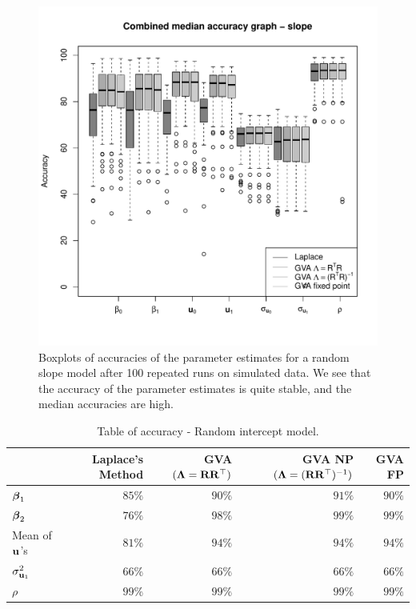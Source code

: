\begin{figure}[h]
	\includegraphics[width=\textwidth]{code/results/median_accuracy_combined_slope.pdf}\bigskip 
	\caption{Boxplots of accuracies of the parameter estimates for a random slope model after 100 repeated
							runs on simulated data. We see that the accuracy of the parameter estimates is quite stable,
							and the median accuracies are high.}
	\label{fig:median_accuracy_slope}
\end{figure}
		
\begin{table}
{\footnotesize
	\begin{tabular}{|l|rrrr|}
		\hline
		                   & Laplace's Method & GVA $({\boldsymbol \Lambda} = {\bf R} {\bf R}^\top)$ & GVA NP $({\boldsymbol \Lambda} = ({\bf R} {\bf R}^\top)^{-1})$ & GVA FP \\
		\hline
		${\boldsymbol \beta}_1$         & $85\%$           & $90\%$                          & $91\%$                                    & $90\%$ \\ 
		${\boldsymbol \beta}_2$         & $76\%$           & $98\%$                          & $99\%$                                    & $99\%$ \\ 
		Mean of ${\bf u}$'s      & $81\%$           & $94\%$                          & $94\%$                                    & $94\%$ \\
		$\sigma^2_{{\bf u}_1}$ & $66\%$           & $66\%$                          & $66\%$                                    & $66\%$ \\ 
		$\rho$             & $99\%$           & $99\%$                          & $99\%$                                    & $99\%$ \\ 
		\hline
	\end{tabular}
}\bigskip
	\caption{Table of accuracy - Random intercept model.}
	\label{tab:accuracy_int}
\end{table}
		

